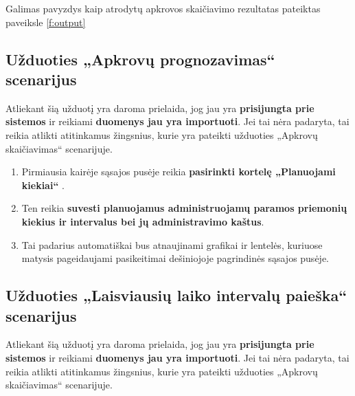 
Galimas pavyzdys kaip atrodytų apkrovos skaičiavimo rezultatas pateiktas paveiksle \ref{f:output}

\subsection{Užduoties „Apkrovų prognozavimas“ scenarijus}

Atliekant šią užduotį yra daroma prielaida, jog jau yra
\textbf{prisijungta prie sistemos} ir reikiami \textbf{duomenys jau yra
importuoti}. Jei tai nėra padaryta, tai reikia atlikti atitinkamus
žingsnius, kurie yra pateikti užduoties „Apkrovų skaičiavimas“
scenarijuje.

\begin{enumerate}
  \item Pirmiausia kairėje sąsajos pusėje reikia \textbf{pasirinkti
    kortelę „Planuojami kiekiai“} .
  \item Ten reikia \textbf{suvesti planuojamus administruojamų paramos
    priemonių kiekius ir intervalus bei jų administravimo kaštus}.
  \item Tai padarius automatiškai bus atnaujinami grafikai ir
    lentelės, kuriuose matysis pageidaujami pasikeitimai dešiniojoje
    pagrindinės sąsajos  pusėje.
\end{enumerate}

\subsection{Užduoties „Laisviausių laiko intervalų paieška“ scenarijus}

Atliekant šią užduotį yra daroma prielaida, jog jau yra
\textbf{prisijungta prie sistemos} ir reikiami \textbf{duomenys jau
yra importuoti}. Jei tai nėra padaryta, tai reikia atlikti atitinkamus
žingsnius, kurie yra pateikti užduoties „Apkrovų skaičiavimas“
scenarijuje.

